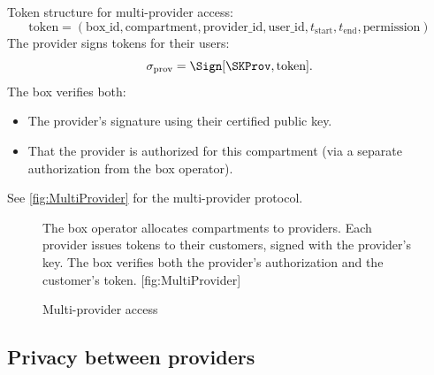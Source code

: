 Token structure for multi-provider access:
\[
  \text{token} = (\text{box\_id}, \text{compartment}, \text{provider\_id}, 
  \text{user\_id}, t_{\text{start}}, t_{\text{end}}, \text{permission})
\]
The provider signs tokens for their users:
\[
  \sigma_{\text{prov}} = \Sign[\SKProv, \text{token}].
\]
The box verifies both:
\begin{itemize}
  \item The provider's signature using their certified public key.
  \item That the provider is authorized for this compartment (via a separate 
    authorization from the box operator).
\end{itemize}

See \cref{fig:MultiProvider} for the multi-provider protocol.

\begin{figure}
  \begin{sidecaption}{%
    The box operator allocates compartments to providers.
    Each provider issues tokens to their customers, signed with the provider's 
    key.
    The box verifies both the provider's authorization and the customer's 
    token.
  }[fig:MultiProvider]
  \flushright
  \begin{msc}
    [/msc/action width=0.32\linewidth]
    {Multi-provider access}
      \nextlevel[2]
      \nextlevel
      \nextlevel[2]
      \nextlevel[2]
      \nextlevel[2]
      \nextlevel
      \nextlevel
      \nextlevel
  \end{msc}
  \end{sidecaption}
\end{figure}

\subsection{Privacy between providers}


